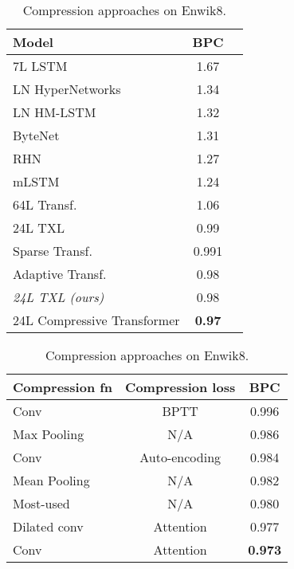 \documentclass{article} \usepackage{iclr2020_conference,times}
\newcommand{\model}{Compressive Transformer}
\begin{document}
\begin{table}[t]
    \footnotesize
    \centering
    \begin{minipage}[t]{0.48\linewidth}
        \centering
            \caption{\footnotesize
                State-of-the-art results on Enwik8.
            }
            \begin{tabular}{l|cc}
                \toprule
                \bf Model & \bf BPC \\
                \midrule
                7L LSTM \citep{graves2013generating}                 & 1.67 \\
                LN HyperNetworks \citet{ha2016hypernetworks}         & 1.34 \\
                LN HM-LSTM \citet{chung2016hierarchical}             & 1.32 \\
                ByteNet \citep{kalchbrenner2016neural}               & 1.31 \\
                RHN \citet{zilly2017recurrent}                       & 1.27 \\
                mLSTM \citet{krause2016multiplicative}               & 1.24 \\
                64L Transf. \citet{al2019character}               & 1.06 \\
                24L TXL \citep{dai2019transformer}          & 0.99 \\
                Sparse Transf. \citep{child2019generating}       & 0.991 \\
                Adaptive Transf. \citep{sukhbaatar2019adaptive}   & 0.98 \\
                \midrule
                \textit{24L TXL (ours)}                   & 0.98 \\
                24L \model                          & \textbf{0.97} \\
                \bottomrule
            \end{tabular}
            \label{table:enwik8}
    \end{minipage}
    \hspace{1em}
    \begin{minipage}[t]{0.48\linewidth}
        \footnotesize
        \centering
        \caption{\footnotesize
            Compression approaches on Enwik8.
        }
        \begin{tabular}{l|cc}
            \toprule
            \bf Compression fn & \bf Compression loss & \bf BPC \\
            \midrule
            Conv & BPTT & 0.996 \\
            Max Pooling & N/A & 0.986 \\
            Conv & Auto-encoding & 0.984 \\
            Mean Pooling & N/A & 0.982 \\
            Most-used & N/A & 0.980 \\
            Dilated conv & Attention & 0.977 \\
            Conv & Attention & \bf 0.973 \\
            \bottomrule
        \end{tabular}
        \label{table:compressions}
    \end{minipage}
\end{table}
\end{document}
